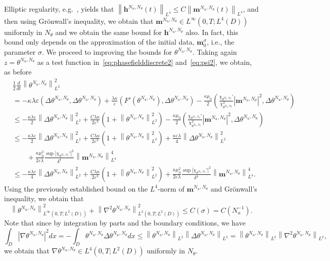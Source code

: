 \documentclass[10pt,letterpaper,twoside]{amsart}
\theoremstyle{definition}{\newtheorem{definition}[lemma]{Definition}}
\theoremstyle{note}{\newtheorem{claim}{Claim}[section]
\newtheorem*{claim*}{Claim}}
\numberwithin{equation}{section}
\newcommand{\dom}{D}
\newcommand{\norm}[1]{\left\| #1 \right\|}
\newcommand{\Grad}{\nabla}
\newcommand{\bm}{\mathbf{m}}
\newcommand{\bmb}{\mathbf{m}^{N_u,N_\theta}}
\newcommand{\bhb}{\mathbf{h}^{N_u,N_\theta}}
\newcommand{\thb}{\theta^{N_u,N_\theta}}
\begin{document}
Elliptic regularity,  e.g.~\cite[Theorem 4.6]{Simader2006}, yields that $\norm{\bhb(t)}_{L^4}\leq C \norm{\bmb(t)}_{L^4}$, and then using Gr\"onwall's inequality, we obtain that $\bmb\in L^\infty(0,T;L^4(\dom))$ uniformly in  $N_\theta$   and we obtain the same bound for $\bhb$ also. In fact, this bound only depends on the approximation of the initial data, $\bm_0^\sigma$, i.e., the parameter $\sigma$.
We proceed to  improving the bounds for $\thb$. Taking again $z=\thb$ as a test function in~\eqref{eq:phasefielddiscrete2} and~\eqref{eq:psi2}, we obtain, as before
\begin{align*}
	&	\frac12\frac{d}{dt}\norm{\theta^{N_u,N_\theta}}_{L^2}^2\\
	&= -\kappa\lambda \varepsilon(\Delta\theta^{N_u,N_\theta},\Delta\theta^{N_u,N_\theta})+ \frac{\lambda\kappa}{\varepsilon}(F'(\theta^{N_u,N_\theta}),\Delta\theta^{N_u,N_\theta}) - \frac{\kappa\mu_0}{2}\left(\frac{\chi_{\theta^{N_u,N_\theta}}'}{\chi_{\theta^{N_u,N_\theta}}^2} |\bm^{N_u,N_\theta}|^2,\Delta\theta^{N_u,N_\theta}\right)\\
		&\leq  -\frac{\kappa \lambda\varepsilon}{2}\norm{\Delta\theta^{N_u,N_\theta}}_{L^2}^2+ \frac{C\lambda\kappa}{2\varepsilon^3}(1+\norm{\theta^{N_u,N_\theta}}_{L^2}^2 )- \frac{\kappa\mu_0}{2}\left(\frac{\chi_{\theta^{N_u,N_\theta}}'}{\chi_{\theta^{N_u,N_\theta}}^2} |\bm^{N_u,N_\theta}|^2,\Delta\theta^{N_u,N_\theta}\right)\\
		&\leq  -\frac{\kappa\lambda \varepsilon}{2}\norm{\Delta\theta^{N_u,N_\theta}}_{L^2}^2+ \frac{C\lambda\kappa}{2\varepsilon^3}(1+\norm{\theta^{N_u,N_\theta}}_{L^2}^2 )+\frac{\kappa\varepsilon\lambda}{4}\norm{\Delta\theta^{N_u,N_\theta}}_{L^2}^2 \\
		&\qquad +  \frac{\kappa\mu_0^2}{2\varepsilon\lambda }\frac{\sup |\chi_{\theta^{N_u,N_\theta}}'|^2}{\delta^4}\norm{\bm^{N_u,N_\theta}}_{L^4}^4\\
		& \leq -\frac{\kappa\lambda \varepsilon}{4}\norm{\Delta\theta^{N_u,N_\theta}}_{L^2}^2+ \frac{C\lambda\kappa}{2\varepsilon^3}(1+\norm{\theta^{N_u,N_\theta}}_{L^2}^2 ) +  \frac{\kappa\mu_0^2}{2\varepsilon\lambda}\frac{\sup |\chi_{\thb}'|^2}{\delta^4}\norm{\bmb}_{L^4}^4.
\end{align*}
Using the previously established bound on the $L^4$-norm of $\bmb$ and Gr\"onwall's inequality, we obtain that
\begin{equation}\label{eq:thetabound}
	\norm{\thb}_{L^\infty(0,T;L^2(\dom))}^2 + \norm{\Grad^2\thb}_{L^2(0,T;L^2(\dom))}^2 \leq C(\sigma)= C(N_u^{-1}).
\end{equation}
Note that since by integration by parts and the boundary conditions, we have
\begin{equation*}
	\int_{\dom} |\Grad\thb|^2 dx  = -\int_{\dom} \thb\Delta \thb dx \leq \norm{\thb}_{L^2}\norm{\Delta \thb}_{L^2} = \norm{\thb}_{L^2}\norm{\Grad^2\thb}_{L^2},
\end{equation*}
we obtain that $\Grad\thb\in L^4(0,T;L^2(\dom))$ uniformly in $N_\theta$.
\end{document}
